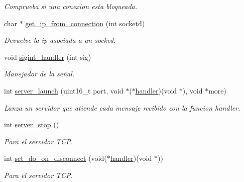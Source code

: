 \begin{DoxyCompactItemize}
\begin{DoxyCompactList}\small\item\em Comprueba si una conexion esta bloqueada. \end{DoxyCompactList}\item 
char $\ast$ \hyperlink{G-2301-01-P1-server_8c_a4e4e41c2d359a3efd0a915d6798b0bf9}{get\+\_\+ip\+\_\+from\+\_\+connection} (int socketd)
\begin{DoxyCompactList}\small\item\em Devuelve la ip asociada a un socked. \end{DoxyCompactList}\item 
void \hyperlink{G-2301-01-P1-server_8c_a258e3b580e688a0cf46e4258525aeaf1}{sigint\+\_\+handler} (int sig)
\begin{DoxyCompactList}\small\item\em Manejador de la señal. \end{DoxyCompactList}\item 
int \hyperlink{G-2301-01-P1-server_8c_ad5a9d9f33a4d6cc629a712fe80189e62}{server\+\_\+launch} (uint16\+\_\+t port, void $\ast$($\ast$\hyperlink{G-2301-01-P1-irc__server_8c_a65c3f29a112085899806687533f22b3e}{handler})(void $\ast$), void $\ast$more)
\begin{DoxyCompactList}\small\item\em Lanza un servidor que atiende cada mensaje recibido con la funcion handler. \end{DoxyCompactList}\item 
int \hyperlink{G-2301-01-P1-server_8c_a5d8d1e7de0b17fabdfb923ea0477a9d9}{server\+\_\+stop} ()
\begin{DoxyCompactList}\small\item\em Para el servidor T\+C\+P. \end{DoxyCompactList}\item 
int \hyperlink{G-2301-01-P1-server_8c_ac66c08677a07f3d18bb3071bd486e13c}{set\+\_\+do\+\_\+on\+\_\+disconnect} (void($\ast$\hyperlink{G-2301-01-P1-irc__server_8c_a65c3f29a112085899806687533f22b3e}{handler})(void $\ast$))
\begin{DoxyCompactList}\small\item\em Para el servidor T\+C\+P. \end{DoxyCompactList}\end{DoxyCompactItemize}
